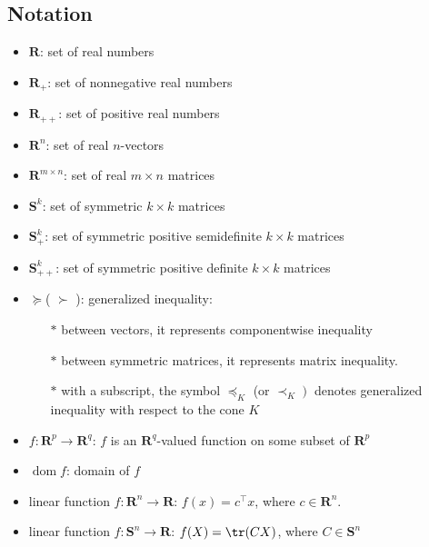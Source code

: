 \documentclass{article}
\newcommand{\dom}{\operatorname{dom}}
\begin{document}
\subsection{Notation}
\begin{itemize}
    \item $\mathbf{R}$: set of real numbers
    \item $\mathbf{R}_{+}$: set of nonnegative real numbers
    \item $\mathbf{R}_{++}$: set of positive real numbers
    \item $\mathbf{R}^{n}$:  set of real $n$-vectors
    \item $\mathbf{R}^{m \times n}$: set of real $m \times n$ matrices
    \item $\mathbf{S}^{k}$: set of symmetric $k \times k$ matrices
    \item $\mathbf{S}_{+}^{k}$: set of symmetric positive semidefinite $k \times k$ matrices
    \item $\mathbf{S}_{++}^{k}$: set of symmetric positive definite $k \times k$ matrices
    \item  $\succeq$( $\succ$ ): generalized inequality:
    \begin{itemize}
        \item[$\ast$]between vectors, it represents componentwise inequality
        \item[$\ast$]between symmetric matrices, it represents matrix inequality.
        \item[$\ast$]with a subscript, the symbol $\preceq_{K}$ (or $\left.\prec_{K}\right)$ denotes generalized inequality with respect to the cone $K$ 
    \end{itemize}
    \item $f: \mathbf{R}^{p} \rightarrow \mathbf{R}^{q}$: $f$ is an $\mathbf{R}^{q}$-valued function on some subset of $\mathbf{R}^{p}$
    \item $\dom  f$: domain of $f$
    \item linear function $f: \mathbf{R}^{n} \rightarrow \mathbf{R}$: $f(x)=c^{\top} x$, where $c \in \mathbf{R}^{n}$. 
    \item  linear function $f: \mathbf{S}^{n} \rightarrow \mathbf{R}$: $f(X)=\tr(CX)$, where $C \in \mathbf{S}^{n}$
\end{itemize}
\end{document}
